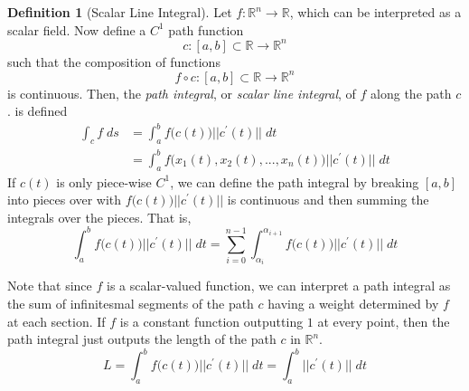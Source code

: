 \documentclass{article}
\theoremstyle{remark}
\theoremstyle{definition}
\newtheorem{definition}{Definition}[section]
\begin{document}
\begin{definition}[Scalar Line Integral]
Let $f: \mathbb{R}^n \longrightarrow \mathbb{R}$, which can be interpreted as a scalar field. Now define a $C^1$ path function 
\[c: [a,b] \subset \mathbb{R} \longrightarrow \mathbb{R}^n \]
such that the composition of functions
\[f \circ c: [a, b] \subset \mathbb{R} \longrightarrow \mathbb{R}^n\]
is continuous. Then, the \textit{path integral}, or \textit{scalar line integral}, of $f$ along the path $c$. is defined
\begin{align*}
    \int_c f \;d s & = \int_a^b f\big(c(t)\big) ||c^\prime (t)|| \;d t \\
    & = \int_a^b f\big( x_1 (t), x_2 (t), ..., x_n (t)\big) ||c^\prime (t)|| \; d t
\end{align*}
If $c(t)$ is only piece-wise $C^1$, we can define the path integral by breaking $[a,b]$ into pieces over with $f\big( c(t)\big) ||c^\prime (t)||$ is continuous and then summing the integrals over the pieces. 
That is, 
\[\int_a^b f\big(c(t)\big) ||c^\prime (t)|| \;d t = \sum_{i = 0}^{n-1} \int_{\alpha_i}^{\alpha_{i+1}} f\big(c(t)\big) ||c^\prime (t)|| \; d t\]
\end{definition}
Note that since $f$ is a scalar-valued function, we can interpret a path integral as the sum of infinitesmal segments of the path $c$ having a weight determined by $f$ at each section. 
If $f$ is a constant function outputting $1$ at every point, then the path integral just outputs the length of the path $c$ in $\mathbb{R}^n$. 
\[L = \int_a^b f\big( c(t)\big) ||c^\prime (t)|| \; d t = \int_a^b ||c^\prime (t)|| \; d t\]
\end{document}
